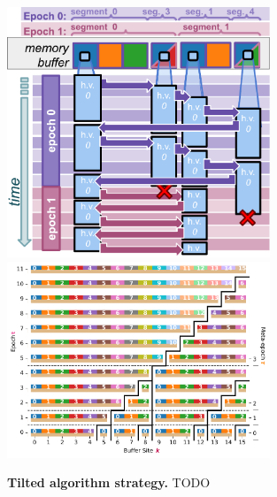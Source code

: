 \begin{figure}
  \centering
\includegraphics[width=0.7\textwidth]{img/hsurf-tilted-intuition}
  \includegraphics[width=0.7\textwidth]{binder/teeplots/20/surface-size=16+viz=site-reservation-at-ranks-heatmap+ext=}
  \caption{
    \textbf{Tilted algorithm strategy.}
    \footnotesize
    TODO
  }
  \label{fig:hsurf-tilted-intuition}
\end{figure}
